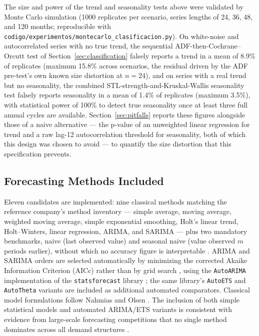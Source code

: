 \documentclass[forecasting,article,submit,pdftex,moreauthors]{Definitions/mdpi}
\begin{document}
The size and power of the trend and seasonality tests above were validated by Monte Carlo simulation (1000 replicates per scenario, series lengths of 24, 36, 48, and 120 months; reproducible with \texttt{codigo/\allowbreak experimentos/\allowbreak montecarlo\_\allowbreak clasificacion.py}). On white-noise and autocorrelated series with no true trend, the sequential ADF-then-Cochrane--Orcutt test of Section~\ref{sec:classification} falsely reports a trend in a mean of 8.9\% of replicates (maximum 15.8\% across scenarios, the residual driven by the ADF pre-test's own known size distortion at $n=24$), and on series with a real trend but no seasonality, the combined STL-strength-and-Kruskal-Wallis seasonality test falsely reports seasonality in a mean of 1.4\% of replicates (maximum 3.5\%), with statistical power of 100\% to detect true seasonality once at least three full annual cycles are available. Section~\ref{sec:pitfalls} reports these figures alongside those of a naive alternative --- the p-value of an unweighted linear regression for trend and a raw lag-12 autocorrelation threshold for seasonality, both of which this design was chosen to avoid --- to quantify the size distortion that this specification prevents.

\subsection{Forecasting Methods Included}
\label{sec:methodsincluded}

Eleven candidates are implemented: nine classical methods matching the reference company's method inventory --- simple average, moving average, weighted moving average, simple exponential smoothing, Holt's linear trend, Holt--Winters, linear regression, ARIMA, and SARIMA --- plus two mandatory benchmarks, naive (last observed value) and seasonal naive (value observed $m$ periods earlier), without which no accuracy figure is interpretable \cite{hyndmankoehler2006}. ARIMA and SARIMA orders are selected automatically by minimizing the corrected Akaike Information Criterion (AICc) rather than by grid search \cite{hyndmankhandakar2008}, using the \texttt{AutoARIMA} implementation of the \texttt{statsforecast} library \cite{garza2022}; the same library's \texttt{AutoETS} and \texttt{AutoTheta} variants are included as additional automated comparators. Classical model formulations follow Nahmias and Olsen \cite{nahmias2015}. The inclusion of both simple statistical models and automated ARIMA/ETS variants is consistent with evidence from large-scale forecasting competitions that no single method dominates across all demand structures \cite{makridakis2020}.
\end{document}
